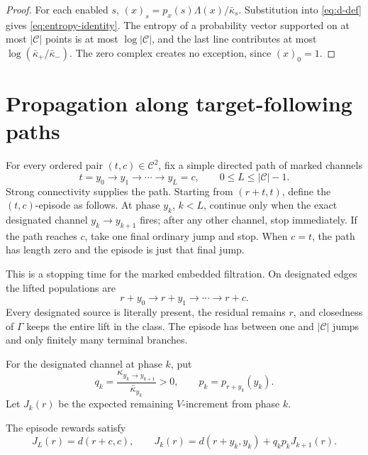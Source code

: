 \begin{proof}
For each enabled \(s\),
\((x)_s=p_x(s)\Lambda(x)/\bar\kappa_s\).  Substitution into
\eqref{eq:d-def} gives \eqref{eq:entropy-identity}.  The entropy of a
probability vector supported on at most \(|\mathcal C|\) points is at most
\(\log|\mathcal C|\), and the last line contributes at most
\(\log(\bar\kappa_+/\bar\kappa_-)\).  The zero complex creates no exception,
since \((x)_0=1\).
\end{proof}

\section{Propagation along target-following paths}\label{sec:paths}

For every ordered pair \((t,c)\in\mathcal C^2\), fix a simple directed path
of marked channels
\begin{equation}\label{eq:path}
 t=y_0\longrightarrow y_1\longrightarrow\cdots
 \longrightarrow y_L=c,
 \qquad 0\le L\le|\mathcal C|-1.
\end{equation}
Strong connectivity supplies the path.  Starting from \((r+t,t)\), define
the \((t,c)\)-episode as follows.  At phase \(y_k\), \(k<L\), continue only
when the exact designated channel \(y_k\to y_{k+1}\) fires; after any other
channel, stop immediately.  If the path reaches \(c\), take one final
ordinary jump and stop.  When \(c=t\), the path has length zero and the
episode is just that final jump.

This is a stopping time for the marked embedded filtration.  On designated
edges the lifted populations are
\begin{equation}\label{eq:lift}
  r+y_0\longrightarrow r+y_1\longrightarrow\cdots\longrightarrow r+c.
\end{equation}
Every designated source is literally present, the residual remains \(r\),
and closedness of \(\Gamma\) keeps the entire lift in the class.  The episode
has between one and \(|\mathcal C|\) jumps and only finitely many terminal
branches.

For the designated channel at phase \(k\), put
\begin{equation}\label{eq:qk}
 q_k=\frac{\kappa_{y_k\to y_{k+1}}}{\bar\kappa_{y_k}}>0,
 \qquad p_k=p_{r+y_k}(y_k).
\end{equation}
Let \(J_k(r)\) be the expected remaining \(V\)-increment from phase \(k\).

\begin{lemma}\label{lem:recursion}
The episode rewards satisfy
\begin{equation}\label{eq:recursion}
  J_L(r)=d(r+c,c),
  \qquad
  J_k(r)=d(r+y_k,y_k)+q_kp_kJ_{k+1}(r).
\end{equation}
\end{lemma}

